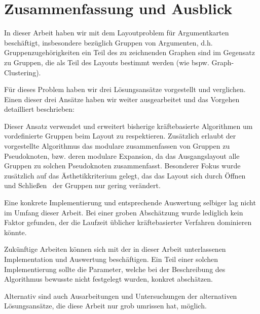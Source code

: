 \chapter{Zusammenfassung und Ausblick}
In dieser Arbeit haben wir mit dem Layoutproblem für Argumentkarten beschäftigt, insbesondere bezüglich %
Gruppen von Argumenten, 
d.h. Gruppenzugehörigkeiten ein Teil des zu zeichnenden Graphen sind im Gegensatz zu Gruppen, die als Teil des Layouts bestimmt werden (wie bspw. Graph-Clustering).

Für dieses Problem haben wir drei Lösungsansätze vorgestellt und verglichen. 
Einen dieser drei Ansätze %
haben wir weiter ausgearbeitet und das Vorgehen detailliert beschrieben:

Dieser Ansatz %
verwendet und erweitert bisherige kräftebasierte Algorithmen um vordefinierte Gruppen beim Layout zu respektieren. 
Zusätzlich erlaubt der vorgestellte Algorithmus das modulare %
zusammenfassen von Gruppen zu Pseudoknoten, %
bzw. deren modulare Expansion, da das Ausgangslayout alle Gruppen zu solchen Pseudoknoten zusammenfasst. 
Besonderer Fokus wurde zusätzlich auf das Ästhetikkriterium gelegt, das das Layout sich durch \glqq Öffnen und Schließen\grqq\  %
der Gruppen nur gering verändert.

Eine konkrete Implementierung und entsprechende Auswertung selbiger lag nicht im Umfang dieser Arbeit.
Bei einer groben Abschätzung wurde lediglich kein %
Faktor gefunden, der die Laufzeit üblicher kräftebasierter Verfahren dominieren %
könnte.

Zukünftige Arbeiten können sich mit der in dieser Arbeit unterlassenen Implementation und Auswertung beschäftigen. 
Ein Teil einer solchen Implementierung sollte die Parameter, welche bei der Beschreibung des Algorithmus bewusste nicht festgelegt wurden, konkret abschätzen.

Alternativ sind auch Ausarbeitungen und Untersuchungen der alternativen Lösungsansätze, die diese Arbeit nur grob umrissen hat, möglich.

